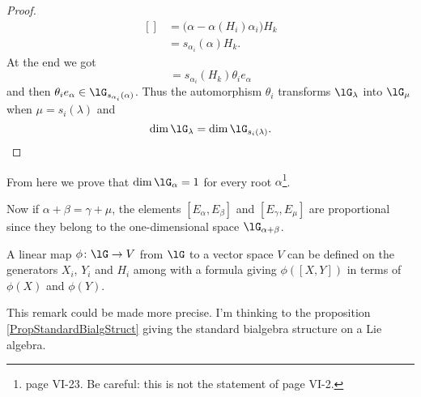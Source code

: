 \begin{proof}
\begin{equation}
\begin{aligned}[]
            &=\big( \alpha-\alpha(H_i)\alpha_i \big)H_k\\
            &=s_{\alpha_i}(\alpha)H_k.
        \end{aligned}
    \end{equation}
    At the end we got
    \begin{equation}
        [H_k,\theta_ie_{\alpha}]=s_{\alpha_i}(H_k)\theta_ie_{\alpha}
    \end{equation}
    and then \( \theta_ie_{\alpha}\in\lG_{s_{\alpha_i}(\alpha)}\). Thus the automorphism \( \theta_i\) transforms \( \lG_{\lambda}\) into \( \lG_{\mu}\) when \( \mu=s_i(\lambda)\) and
    \begin{equation}
        \dim\lG_{\lambda}=\dim\lG_{s_i(\lambda)}.
    \end{equation}
\end{proof}
From here we prove that \( \dim\lG_{\alpha}=1\) for every root \( \alpha\)\footnote{\cite{SerreSSAlgebres} page VI-23. Be careful: this is not the statement of page VI-2.}. 

Now if \( \alpha+\beta=\gamma+\mu\), the elements \( [E_{\alpha},E_{\beta}]\) and \( [E_{\gamma},E_{\mu}]\) are proportional since they belong to the one-dimensional space \( \lG_{\alpha+\beta}\).


\begin{remark}      \label{RemChevDefmapCommXH}
    A linear map \( \phi\colon \lG\to V\) from \( \lG\) to a vector space \( V\) can be defined on the generators \( X_i\), \( Y_i\) and \( H_i\) among with a formula giving \( \phi([X,Y])\) in terms of \( \phi(X)\) and \( \phi(Y)\).
\end{remark}

\begin{probleme}
    This remark could be made more precise. I'm thinking to the proposition \ref{PropStandardBialgStruct} giving the standard bialgebra structure on a Lie algebra.
\end{probleme}

